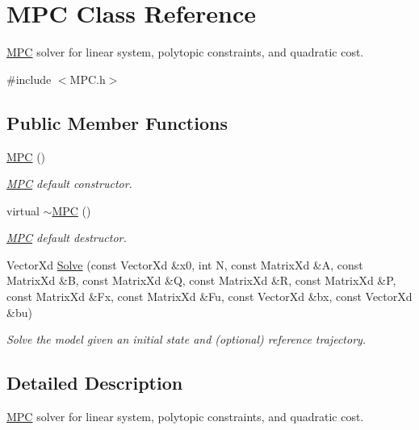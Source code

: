 \hypertarget{classMPC}{}\section{M\+PC Class Reference}
\label{classMPC}


\mbox{\hyperlink{classMPC}{M\+PC}} solver for linear system, polytopic constraints, and quadratic cost.  




{\ttfamily \#include $<$M\+P\+C.\+h$>$}

\subsection*{Public Member Functions}
\begin{DoxyCompactItemize}
\item 
\mbox{\label{classMPC_aa00d954d8326ede0331abaf7a7a36815}} 
\mbox{\hyperlink{classMPC_aa00d954d8326ede0331abaf7a7a36815}{M\+PC}} ()
\begin{DoxyCompactList}\small\item\em \mbox{\hyperlink{classMPC}{M\+PC}} default constructor. \end{DoxyCompactList}\item 
\mbox{\label{classMPC_a96c471412e292fd52b90bf8cac8473f1}} 
virtual \mbox{\hyperlink{classMPC_a96c471412e292fd52b90bf8cac8473f1}{$\sim$\+M\+PC}} ()
\begin{DoxyCompactList}\small\item\em \mbox{\hyperlink{classMPC}{M\+PC}} default destructor. \end{DoxyCompactList}\item 
Vector\+Xd \mbox{\hyperlink{classMPC_ab66c070c8bf92ee7d16a1ea521f6ec2f}{Solve}} (const Vector\+Xd \&x0, int N, const Matrix\+Xd \&A, const Matrix\+Xd \&B, const Matrix\+Xd \&Q, const Matrix\+Xd \&R, const Matrix\+Xd \&P, const Matrix\+Xd \&Fx, const Matrix\+Xd \&Fu, const Vector\+Xd \&bx, const Vector\+Xd \&bu)
\begin{DoxyCompactList}\small\item\em Solve the model given an initial state and (optional) reference trajectory. \end{DoxyCompactList}\end{DoxyCompactItemize}


\subsection{Detailed Description}
\mbox{\hyperlink{classMPC}{M\+PC}} solver for linear system, polytopic constraints, and quadratic cost. 

